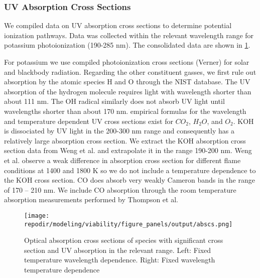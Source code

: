 \subsubsection{UV Absorption Cross Sections}

We compiled data on UV absorption cross sections to determine potential ionization pathways. Data was collected within the relevant wavelength range for potassium photoionization (190-285 nm). The consolidated data are shown in \ref{fig:SI_UV_abscs}.  

For potassium we use compiled photoionization cross sections (Verner) for solar and blackbody radiation.\cite{huebnerPhotoionizationPhotodissociationRates2015} Regarding the other constituent gasses, we first rule out absorption by the atomic species H and O through the NIST database.\cite{sansonettiHandbookBasicAtomic2005} The UV absorption of the hydrogen molecule requires light with wavelength shorter than about 111 nm.\cite{franceFARULTRAVIOLETMOLECULARHYDROGEN} The OH radical similarly does not absorb UV light until wavelengths shorter than about 170 nm.\cite{chipmanAbsorptionSpectrumOH2008} empirical formulas for the wavelength and temperature dependent UV cross sections exist for $CO_2$\cite{oehlschlaegerUltravioletAbsorptionCrosssections2004}, $H_2O$,\cite{zuevUVABSORPTIONCROSS} and $O_2$.\cite{zuevUVABSORPTIONCROSS} KOH is dissociated by UV light in the 200-300 nm range and consequently has a relatively large absorption cross section. We extract the KOH absorption cross section data from Weng et al. and extrapolate it in the range 190-200 nm.\cite{wengUltravioletAbsorptionCross2019} Weng et al. observe a weak difference in absorption cross section for different flame conditions at 1400 and 1800 K so we do not include a temperature dependence to the KOH cross section. CO does absorb very weakly Cameron bands in the range of 170 -- 210 nm. We include CO absorption through the room temperature absorption measurements performed by Thompson et al.\cite{thompsonUltravioletAbsorptionCoefficients1963}


\begin{figure}[h]
    \texttt{[image: \\repodir/modeling/viability/figure\_panels/output/abscs.png]} 
    \caption{Optical absorption cross sections of species with significant cross section and UV absorption in the relevant range. Left: Fixed temperature wavelength dependence. Right: Fixed wavelength temperature dependence}
    \label{fig:SI_UV_abscs}
\end{figure}


